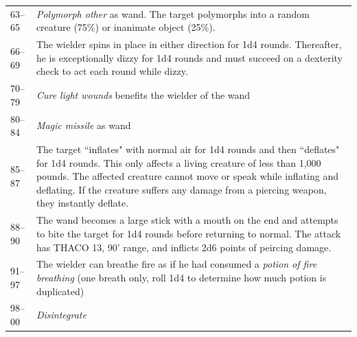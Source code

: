 \begin{longtable}{|p{}|p{}|}
63--65	& \textit{Polymorph other} as wand.  The target polymorphs into a random creature (75\%) or inanimate object (25\%). \\
\rowcolor[gray]{.9}66--69	& The wielder spins in place in either direction for 1d4 rounds.  Thereafter, he is exceptionally dizzy for 1d4 rounds and must succeed on a dexterity check to act each round while dizzy. \\
70--79	& \textit{Cure light wounds} benefits the wielder of the wand \\
\rowcolor[gray]{.9}80--84	& \textit{Magic missile} as wand \\
85--87	& The target ``inflates" with normal air for 1d4 rounds and then ``deflates" for 1d4 rounds.  This only affects a living creature of less than 1,000 pounds.  The affected creature cannot move or speak while inflating and deflating.  If the creature suffers any damage from a piercing weapon, they instantly deflate. \\
\rowcolor[gray]{.9}88--90	& The wand becomes a large stick with a mouth on the end and attempts to bite the target for 1d4 rounds before returning to normal.  The attack has THACO 13, 90' range, and inflicts 2d6 points of peircing damage.  \\
91--97	& The wielder can breathe fire as if he had consumed a \textit{potion of fire breathing} (one breath only, roll 1d4 to determine how much potion is duplicated) \\
\rowcolor[gray]{.9}98--00	& \textit{Disintegrate} \\
\end{longtable}

